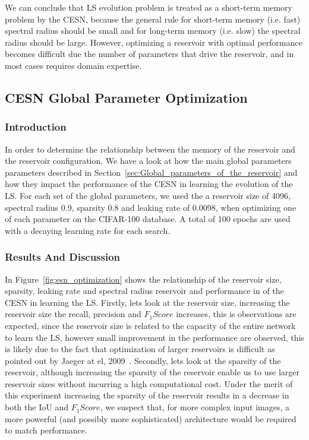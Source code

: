 \documentclass{WitsPhysicsReport}
\begin{document}
We can conclude that LS evolution problem is treated as a short-term memory problem by the CESN, because the general rule for short-term memory (i.e. fast) spectral radius should be small and for long-term memory (i.e. slow) the spectral radius should be large.  However, optimizing a reservoir with optimal performance becomes difficult due the number of parameters that drive the reservoir, and in most cases requires domain expertise.
\newpage
\subsection{CESN Global Parameter Optimization}
\label{sec:esn_global_parameter_optimization}

\subsubsection{Introduction}


In order to determine the relationship  between the memory of the reservoir and the  reservoir configuration.  We have a look at how the main global parameters parameters described in Section~\ref{sec:Global_parameters_of_the_reservoir} and how they impact the performance of the CESN in learning the evolution of the LS. For each set of the global parameters, we used the a reservoir size of 4096, spectral radius 0.9, sparsity 0.8 and leaking rate of 0.0098, when optimizing one of each parameter on the CIFAR-100 database. A total of 100 epochs are used with a decaying learning rate for each search.

\subsubsection{Results And Discussion}

In Figure~\ref{fig:esn_optimization} shows the relationship of the reservoir size, sparsity, leaking rate and spectral radius reservoir and performance in of the CESN in learning the LS.  Firstly, lets look at the reservoir size, increasing the reservoir size the recall, precision and $F_{1}Score$ increases, this is observations are expected, since the reservoir size is related to the capacity of the entire network to learn the LS, however small improvement in the performance are observed, this is likely due to the fact that optimization of larger reservoirs is difficult as pointed out by Jaeger at el, 2009~\cite{jaeger2002tutorial}. Secondly, lets look at the sparsity of the reservoir, although increasing the sparsity of the reservoir enable us to use larger reservoir sizes without incurring a high computational cost. Under the merit of this experiment increasing the sparsity of the reservoir results in a decrease in both the IoU and $F_{1}Score$, we suspect that, for more complex input images, a more powerful (and possibly more sophisticated) architecture would be required to match performance. 
\end{document}
